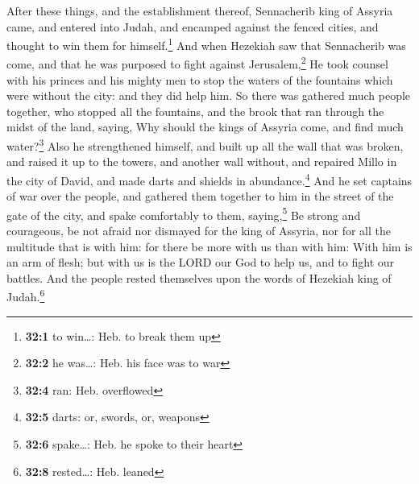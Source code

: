  After these things, and the establishment thereof,
Sennacherib king of Assyria came, and entered into Judah, and encamped
against the fenced cities, and thought to win them for
himself.\footnote{\textbf{32:1} to win\ldots: Heb. to break them up}
 And when Hezekiah saw that Sennacherib was come, and that
he was purposed to fight against Jerusalem,\footnote{\textbf{32:2} he
  was\ldots: Heb. his face was to war}  He took counsel
with his princes and his mighty men to stop the waters of the fountains
which were without the city: and they did help him.  So
there was gathered much people together, who stopped all the fountains,
and the brook that ran through the midst of the land, saying, Why should
the kings of Assyria come, and find much water?\footnote{\textbf{32:4}
  ran: Heb. overflowed}  Also he strengthened himself, and
built up all the wall that was broken, and raised it up to the towers,
and another wall without, and repaired Millo in the city of David, and
made darts and shields in abundance.\footnote{\textbf{32:5} darts: or,
  swords, or, weapons}  And he set captains of war over
the people, and gathered them together to him in the street of the gate
of the city, and spake comfortably to them, saying,\footnote{\textbf{32:6}
  spake\ldots: Heb. he spoke to their heart}  Be strong
and courageous, be not afraid nor dismayed for the king of Assyria, nor
for all the multitude that is with him: for there be more with us than
with him:  With him is an arm of flesh; but with us is the
LORD our God to help us, and to fight our battles. And the people rested
themselves upon the words of Hezekiah king of Judah.\footnote{\textbf{32:8}
  rested\ldots: Heb. leaned}

